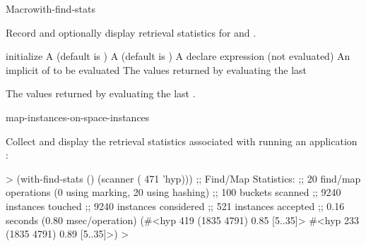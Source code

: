\documentclass[10pt,twoside,english,pdftex]{article}
\begin{document}

\begin{functiondoc}{Macro}{with-find-stats}%
  {\code{(} \code{)}
    }
%
%
%
%
  
\fnsyntax

\fnpurpose 
{}%
%
Record and optionally display retrieval statistics for 
 and
.

\fnpackage {}

\fnmodule {}

\fnargs
\begin{args}{initialize}
\arg[initialize] A (default is )
\arg[report] A (default is )
\arg[declaration] A declare expression (not evaluated)
\arg[forms] An implicit  of  to be evaluated
\arg[results] The values returned by evaluating the last 
\end{args}

\fnreturns The values returned by evaluating the last .

\begin{alsos}{map-instances-on-space-instances}
\end{alsos}

\fnexample
{}%
Collect and display the retrieval statistics associated with
running an application  :
%
\W\supp
\begin{example}
  > (with-find-stats ()
       (scanner ( 471 'hyp)))
  ;; Find/Map Statistics:
  ;;        20 find/map operations (0 using marking, 20 using hashing)
  ;;       100 buckets scanned
  ;;      9240 instances touched
  ;;      9240 instances considered
  ;;       521 instances accepted
  ;;      0.16 seconds (0.80 msec/operation)
  (#<hyp 419 (1835 4791) 0.85 [5..35]>
   #<hyp 233 (1835 4791) 0.89 [5..35]>)
  >
\end{example}

\end{functiondoc}
\end{document}
